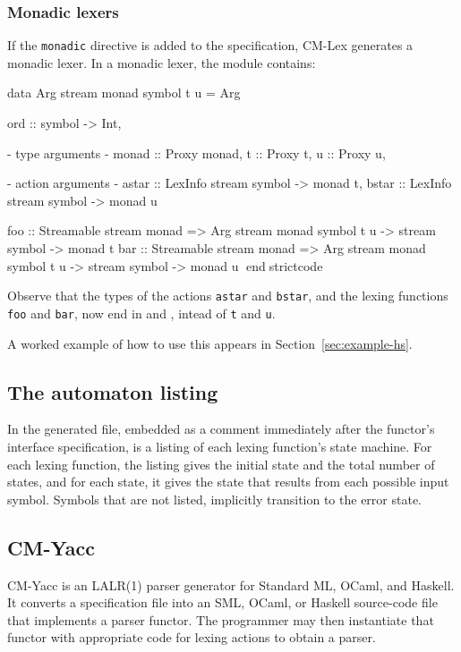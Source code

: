\documentclass[10pt]{article}
\begin{document}
\begin{strictcode}
\begin{strictcode}
\begin{strictcode}
\begin{strictcode}
\begin{strictcode}
\begin{strictcode}
\subsubsection{Monadic lexers}

If the {\tt monadic} directive is added to the specification, CM-Lex
generates a monadic lexer.  In a monadic lexer, the module contains:

\begin{strictcode}
data Arg stream monad symbol t u =
   Arg { ord :: symbol -> Int,

         {- type arguments -}
         monad :: Proxy monad,
         t :: Proxy t,
         u :: Proxy u,

         {- action arguments -}
         astar :: LexInfo stream symbol -> monad t,
         bstar :: LexInfo stream symbol -> monad u }

foo :: Streamable stream monad
       => Arg stream monad symbol t u -> stream symbol -> monad t
bar :: Streamable stream monad
       => Arg stream monad symbol t u -> stream symbol -> monad u
endstrictcode

Observe that the types of the actions {\tt astar} and {\tt bstar}, and
the lexing functions {\tt foo} and {\tt bar}, now end in  and , intead of {\tt t} and {\tt u}.

A worked example of how to use this appears in Section~\ref{sec:example-hs}.


\subsection{The automaton listing}

In the generated file, embedded as a comment immediately after the
functor's interface specification, is a listing of each lexing
function's state machine.  For each lexing function, the listing gives
the initial state and the total number of states, and for each state,
it gives the state that results from each possible input symbol.
Symbols that are not listed, implicitly transition to the error
state.



\section{CM-Yacc}

CM-Yacc is an LALR(1) parser generator for Standard ML, OCaml, and Haskell.
It converts a specification file into an SML, OCaml, or Haskell source-code
file that implements a parser functor.  The programmer may then
instantiate that functor with appropriate code for lexing actions to
obtain a parser.



\end{strictcode}
\end{strictcode}
\end{strictcode}
\end{strictcode}
\end{strictcode}
\end{strictcode}
\end{strictcode}
\end{document}
